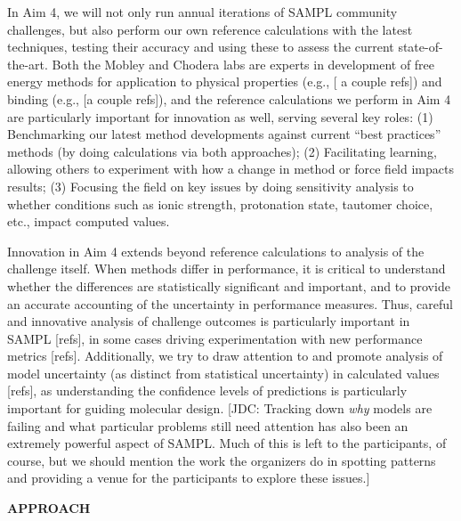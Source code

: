 \documentclass[11pt]{article}
\begin{document}
In Aim 4, we will not only run annual iterations of SAMPL community challenges, but also perform our own reference calculations with the latest techniques, testing their accuracy and using these to assess the current state-of-the-art.
Both the Mobley and Chodera labs are experts in development of free energy methods for application to physical properties (e.g., [ a couple refs]) and binding (e.g., [a couple refs]), and the reference calculations we perform in Aim 4 are particularly important for innovation as well, serving several key roles: (1) Benchmarking our latest method developments against current ``best practices'' methods (by doing calculations via both approaches); (2) Facilitating learning, allowing others to experiment with how a change in method or force field impacts results; (3) Focusing the field on key issues by doing sensitivity analysis to whether conditions such as ionic strength, protonation state, tautomer choice, etc., impact computed values.

Innovation in Aim 4 extends beyond reference calculations to analysis of the challenge itself.
When methods differ in performance, it is critical to understand whether the differences are statistically significant and important, and to provide an accurate accounting of the uncertainty in performance measures. 
Thus, careful and innovative analysis of challenge outcomes is particularly important in SAMPL [refs], in some cases driving experimentation with new performance metrics [refs].
Additionally, we try to draw attention to and promote analysis of model uncertainty (as distinct from statistical uncertainty) in calculated values [refs], as understanding the confidence levels of predictions is particularly important for guiding molecular design.
{\color{red}[JDC: Tracking down \emph{why} models are failing and what particular problems still need attention has also been an extremely powerful aspect of SAMPL. Much of this is left to the participants, of course, but we should mention the work the organizers do in spotting patterns and providing a venue for the participants to explore these issues.]}


{\large \bf APPROACH}
\end{document}
